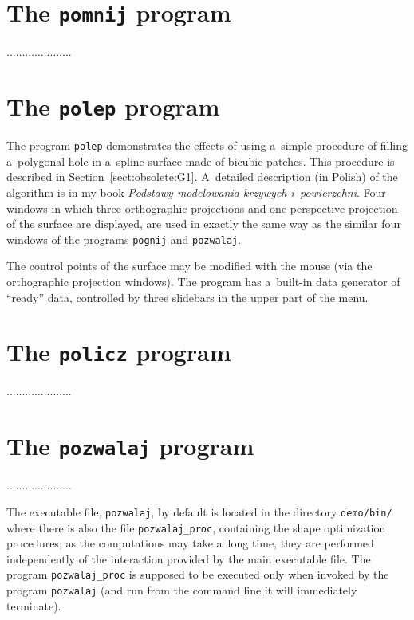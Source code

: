 \section{The \texttt{pomnij} program}

.....................

\section{The \texttt{polep} program}

The program \texttt{polep} demonstrates the effects of using a~simple
procedure of filling a~polygonal hole in a~spline surface made of bicubic
patches. This procedure is described in Section~\ref{sect:obsolete:G1}.
A~detailed description (in Polish) of the algorithm is in my book
\textsl{Podstawy modelowania krzywych i~powierzchni}. Four windows
in which three orthographic projections and one perspective projection
of the surface are displayed, are used in exactly the same way as the
similar four windows of the programs \texttt{pognij} and \texttt{pozwalaj}.

The control points of the surface may be modified with the mouse
(via the orthographic projection windows). The program has a~built-in
data generator of ``ready'' data, controlled by three slidebars in the
upper part of the menu.

\section{The \texttt{policz} program}

.....................

\newpage
\section{\label{sect:demo:pozwalaj}The \texttt{pozwalaj} program}

.....................


The executable file, \texttt{pozwalaj}, by default is located in the
directory \texttt{demo/bin/} where there is also the file
\texttt{pozwalaj\_proc}, containing the shape optimization procedures; as the
computations may take a~long time, they are performed independently of the
interaction provided by the main executable file. The program
\texttt{pozwalaj\_proc} is supposed to be executed only when invoked by the
program \texttt{pozwalaj} (and run from the command line it will
immediately terminate).


